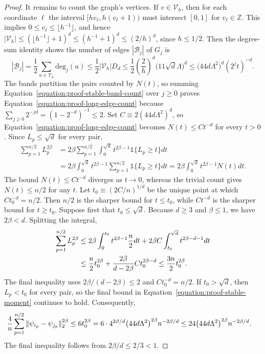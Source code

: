\documentclass[letterpaper,12pt]{article}
\theoremstyle{definition}
\numberwithin{equation}{section}
\newcommand{\one}{\mathds{1}}
\begin{document}
\begin{proof}
It remains to count the graph's vertices.
If $v\in\mathcal V_h$, then for each coordinate $\ell$ the interval $[hv_\ell,h(v_\ell+1))$ must intersect $[0,1]$ for $v_\ell \in \mathbb Z$.
This implies $0\leq v_\ell\leq\lfloor h^{-1}\rfloor$, and hence $|\mathcal V_h|\leq(\lfloor h^{-1}\rfloor+1)^d\leq(h^{-1}+1)^d\leq(2/h)^d$, since $h\leq1/2$.
Then the degree-sum identity shows the number of edges $|\mathcal B_j|$ of $G_j$ is
\begin{equation}\label{equation:proof-stable-band-count}
|\mathcal B_j|=\frac12\sum_{u\in\mathcal V_h}\mathrm{deg}_j(u)\leq\frac12|\mathcal V_h|D_d\leq\frac12\left(\frac2h\right)^d\bigl(11\sqrt d\Lambda\bigr)^d\leq\bigl(44d\Lambda^2\bigr)^d(2^jt)^{-d}.
\end{equation}
The bands partition the pairs counted by $N(t)$, so summing Equation~\eqref{equation:proof-stable-band-count} over $j\geq0$ proves Equation~\eqref{equation:proof-long-edge-count} because $\sum_{j\geq0}2^{-jd}=(1-2^{-d})^{-1}\leq2$.
Set $C\equiv2(44d\Lambda^2)^d$, so Equation~\eqref{equation:proof-long-edge-count} becomes $N(t)\leq Ct^{-d}$ for every $t>0$.
Since $L_p\leq\sqrt d$ for every pair,
\begin{align*}
\sum_{p=1}^{n/2}L_p^{2\beta}&=2\beta\sum_{p=1}^{n/2}\int_0^{\sqrt d}t^{2\beta-1}\one\{L_p\geq t\}dt\\
&=2\beta\int_0^{\sqrt d}t^{2\beta-1}\sum_{p=1}^{n/2}\one\{L_p\geq t\}dt=2\beta\int_0^{\sqrt d}t^{2\beta-1}N(t)dt.
\end{align*}
The bound $N(t) \le Ct^{-d}$ diverges as $t \to 0$, whereas the trivial count gives $N(t)\leq n/2$ for any $t$.
Let $t_0\equiv(2C/n)^{1/d}$ be the unique point at which $Ct_0^{-d}=n/2$.
Then $n/2$ is the sharper bound for $t\leq t_0$, while $Ct^{-d}$ is the sharper bound for $t\geq t_0$.
Suppose first that $t_0\leq\sqrt d$.
Because $d\geq3$ and $\beta\leq1$, we have $2\beta<d$.
Splitting the integral,
\begin{align}
\sum_{p=1}^{n/2}L_p^{2\beta}&\leq2\beta\int_0^{t_0}t^{2\beta-1}\frac n2dt+2\beta C\int_{t_0}^{\sqrt d}t^{2\beta-d-1}dt\notag\\
&\leq\frac n2t_0^{2\beta}+\frac{2\beta}{d-2\beta}Ct_0^{2\beta-d}\leq\frac{3n}{2}t_0^{2\beta}. \label{equation:proof-stable-moment}
\end{align}
The final inequality uses $2\beta/(d-2\beta)\leq2$ and $Ct_0^{-d}=n/2$.
If $t_0>\sqrt d$, then $L_p<t_0$ for every pair, so the final bound in Equation~\eqref{equation:proof-stable-moment} continues to hold.
Consequently,
\begin{align}
\frac{4}{n}\sum_{p=1}^{n/2}\|\psi_{i_p}-\psi_{j_p}\|_2^{2\beta}&\leq6t_0^{2\beta}=6\cdot4^{2\beta/d}\bigl(44d\Lambda^2\bigr)^{2\beta}n^{-2\beta/d}\leq24\bigl(44d\Lambda^2\bigr)^{2\beta}n^{-2\beta/d}. \notag
\end{align}
The final inequality follows from $2\beta/d\leq2/3<1$.
\end{proof}
\end{document}
